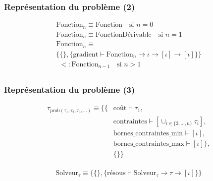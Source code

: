 \documentclass[14pt,utf8x,hyperref={pdfpagelabels=false}]{beamer}
\begin{document}
\begin{slideDecision}
  \begin{changeleftmargin}{1.1cm}
    \frametitle{Représentation du problème (2)}

    \begin{equation*}
      \begin{array}{l}
        \text{Fonction}_n \equiv \text{Fonction} \quad \text{si $n = 0$}\\
        \text{Fonction}_n \equiv \text{FonctionDérivable} \quad \text{si $n = 1$}\\
        \text{Fonction}_n \equiv \\
        \{ \{ \}, \{ \text{gradient} \vdash \text{Fonction}_n \rightarrow \iota \rightarrow [\iota] \rightarrow [\iota] \} \}\\
        ~~<: \text{Fonction}_{n-1} \quad \text{si $n > 1$}\\
      \end{array}
    \end{equation*}
    
  \end{changeleftmargin}
\end{slideDecision}

\begin{slideDecision}
  \begin{changeleftmargin}{1.1cm}
    \frametitle{Représentation du problème (3)}

  \begin{equation*}
  \begin{split}
    \tau_{\text{prob}(\tau_1, \tau_2, \tau_3, \dotsc)} \equiv
    \{ \{ & \text{coût} \vdash \tau_1,\\
    & \text{contraintes} \vdash [\cup_{i \in \{2, \dotsc, n\}} \tau_i],\\
    & \text{bornes\_contraintes\_min} \vdash [\iota], \\
    & \text{bornes\_contraintes\_max} \vdash [\iota] \},\\
    & \{ \} \}\\
  \end{split}
  \end{equation*}

  \begin{equation*}
    \text{Solveur}_{\tau} \equiv \{ \{ \}, \{ \text{résous} \vdash
    \text{Solveur}_{\tau} \rightarrow \tau \rightarrow [\iota] \} \}
  \end{equation*}
  \end{changeleftmargin}
\end{slideDecision}
\end{document}
